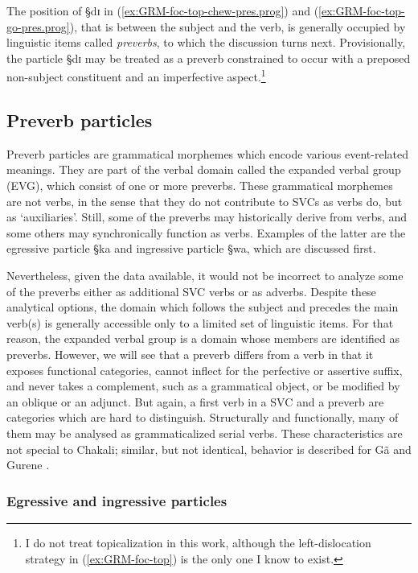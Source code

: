 The position of {\S dɪ} in  (\ref{ex:GRM-foc-top-chew-pres.prog}) and 
 (\ref{ex:GRM-foc-top-go-pres.prog}), that is between the subject and the verb,
is generally occupied by linguistic items called  {\it preverbs},  to which the
discussion turns next.  Provisionally, the particle {\S dɪ} may be treated as a
preverb constrained to occur with  a preposed  non-subject constituent and
an imperfective aspect.\footnote{I do not treat topicalization in this work,
although the left-dislocation strategy in (\ref{ex:GRM-foc-top}) is the only
one I know to exist.}

\subsection{Preverb particles}
\label{sec:GRM-precerv}

Preverb particles are grammatical morphemes which encode various event-related
meanings. They are part of the verbal domain  called the expanded verbal group
(EVG), which  consist of  one or more preverbs.  These grammatical morphemes are
not verbs, in the sense that they do not contribute to SVCs as verbs do,  but as
`auxiliaries'. Still,  some of the preverbs may historically derive from verbs, 
and  some others may synchronically function as verbs.  Examples of the latter
are the egressive particle {\S ka} and ingressive particle {\S wa},  which are
discussed first. 


Nevertheless, given the data available,  it would not be incorrect to analyze
some of the preverbs  either as additional SVC verbs or as adverbs. Despite
these analytical options, the domain which follows the subject and precedes the
main verb(s) is generally accessible  only to a limited set of linguistic items.
For that reason, the expanded verbal group is a domain whose members are
identified as preverbs. However, we will see  that a preverb differs from a verb
in that it exposes functional categories,  cannot inflect for the perfective or
assertive suffix,  and never takes  a complement, such as a grammatical object,
or be modified by an oblique or an adjunct. But again,  a first verb in a SVC
and a preverb are categories which are hard to distinguish. Structurally and
functionally, many of them may be analysed as grammaticalized serial verbs.
These characteristics are not special to Chakali; similar, but not identical,
behavior is described for Gã and Gurene \citep{Daku07b, Daku08}.



\subsubsection{Egressive and ingressive particles}
\label{sec:GRM-EVC-egr-ingr}


